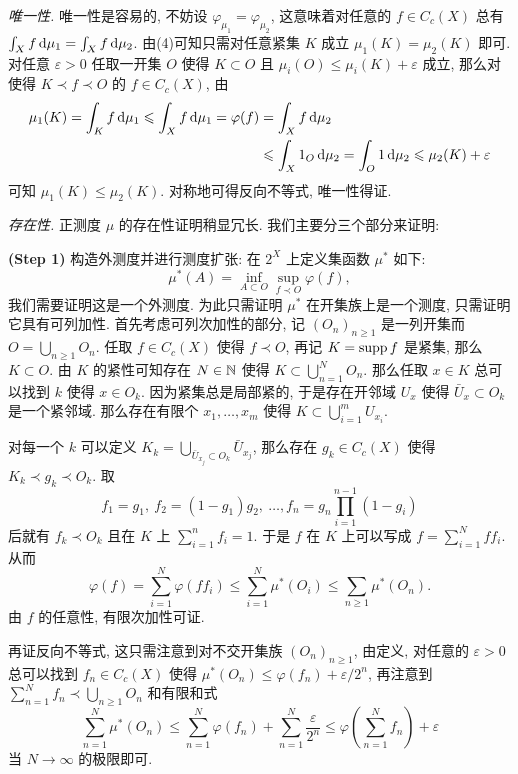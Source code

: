 	\begin{Proof}
		\textsl{唯一性.} 唯一性是容易的, 不妨设 $ \varphi_{\mu_1}=\varphi_{\mu_2} $, 这意味着对任意的 $ f\in C_c(X) $ 总有 $ \int_Xf\,\mathrm{d}\mu_1=\int_Xf\,\mathrm{d}\mu_2 $. 由(4)可知只需对任意紧集 $ K $ 成立 $ \mu_1(K)=\mu_2(K) $ 即可. 对任意 $ \varepsilon>0 $ 任取一开集 $ O $ 使得 $ K\subset O $ 且 $ \mu_i(O)\leqslant\mu_i(K)+\varepsilon $ 成立, 那么对使得 $ K\prec f\prec O $ 的 $ f\in C_c(X) $, 由
		\[
			\begin{aligned}
			\mu_1(K)=\int_Kf\,\mathrm{d}\mu_1\leqslant\int_Xf\,\mathrm{d}\mu_1=\varphi(f)&=\int_Xf\,\mathrm{d}\mu_2\\
			&\leqslant\int_X1_O\,\mathrm{d}\mu_2=\int_O1\,\mathrm{d}\mu_2\leqslant\mu_2(K)+\varepsilon
			\end{aligned}
		\]
		可知 $ \mu_1(K)\leqslant\mu_2(K) $. 对称地可得反向不等式, 唯一性得证.

		\textsl{存在性.} 正测度 $ \mu $ 的存在性证明稍显冗长. 我们主要分三个部分来证明:

		\textbf{(Step 1)} 构造外测度并进行测度扩张: 在 $ 2^X $ 上定义集函数 $ \mu^* $ 如下:
		\[
			\mu^*(A)=\inf_{A\subset O}\sup_{f\prec O}\varphi(f),
		\]
		我们需要证明这是一个外测度. 为此只需证明 $ \mu^* $ 在开集族上是一个测度, 只需证明它具有可列加性. 首先考虑可列次加性的部分, 记 $ (O_n)_{n\geqslant 1} $ 是一列开集而 $ O=\bigcup\limits_{n\geqslant 1}O_n $. 任取 $ f\in C_c(X) $ 使得 $ f\prec O $, 再记 $ K=\mathrm{supp}\, f $ 是紧集, 那么 $ K\subset O $. 由 $ K $ 的紧性可知存在 $ N\in\mathbb{N} $ 使得 $ K\subset\bigcup\limits_{n=1}^NO_n $. 那么任取 $ x\in K $ 总可以找到 $ k $ 使得 $ x\in O_k $. 因为紧集总是局部紧的, 于是存在开邻域 $ U_x $ 使得 $ \bar{U}_x\subset O_k $ 是一个紧邻域. 那么存在有限个 $ x_1,\dots,x_m $ 使得 $ K\subset\bigcup\limits_{i=1}^mU_{x_i} $.

		对每一个 $ k $ 可以定义 $ K_k=\bigcup\limits_{\bar{U}_{x_j}\subset O_k}\bar{U}_{x_j} $, 那么存在 $ g_k\in C_c(X) $ 使得 $ K_k\prec g_k\prec O_k $. 取
		\[
			f_1=g_1,\ f_2=(1-g_1)g_2,\ \dots, f_n=g_n\prod_{i=1}^{n-1}(1-g_i)
		\]
		后就有 $ f_k\prec O_k $ 且在 $ K $ 上 $ \sum\limits_{i=1}^nf_i=1 $. 于是 $ f $ 在 $ K $ 上可以写成 $ f=\sum\limits_{i=1}^Nff_i $. 从而
		\[
			\varphi(f)=\sum_{i=1}^N\varphi(ff_i)\leqslant\sum_{i=1}^N\mu^*(O_i)\leqslant\sum_{n\geqslant 1}\mu^*(O_n).
		\]
		由 $ f $ 的任意性, 有限次加性可证.

		再证反向不等式, 这只需注意到对不交开集族 $ (O_n)_{n\geqslant 1} $, 由定义, 对任意的 $ \varepsilon>0 $ 总可以找到 $ f_n\in C_c(X) $ 使得 $ \mu^*(O_n)\leqslant\varphi(f_n)+\varepsilon/2^n $, 再注意到 $ \sum\limits_{n=1}^Nf_n\prec \bigcup\limits_{n\geqslant 1}O_n $ 和有限和式
		\[
			\sum_{n=1}^N\mu^*(O_n)\leqslant\sum_{n=1}^N\varphi(f_n)+\sum_{n=1}^N\frac{\varepsilon}{2^n}\leqslant\varphi\left( \sum_{n=1}^Nf_n \right)+\varepsilon
		\]
		当 $ N\to\infty $ 的极限即可.


\end{Proof}
